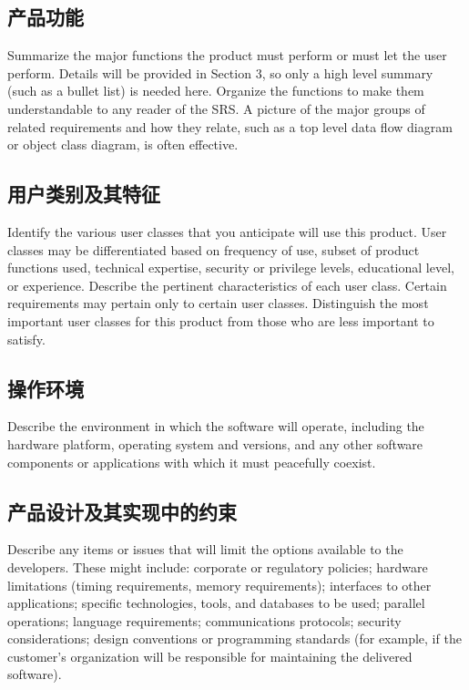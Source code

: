 \documentclass{ctexart}
\begin{document}
\subsection{产品功能}
Summarize the major functions the product must perform or must let the user 
perform. Details will be provided in Section 3, so only a high level summary 
(such as a bullet list) is needed here. Organize the functions to make them 
understandable to any reader of the SRS. A picture of the major groups of 
related requirements and how they relate, such as a top level data flow diagram 
or object class diagram, is often effective.


\subsection{用户类别及其特征}
Identify the various user classes that you anticipate will use this product.  
User classes may be differentiated based on frequency of use, subset of product 
functions used, technical expertise, security or privilege levels, educational 
level, or experience. Describe the pertinent characteristics of each user class.  
Certain requirements may pertain only to certain user classes. Distinguish the 
most important user classes for this product from those who are less important 
to satisfy.


\subsection{操作环境}
Describe the environment in which the software will operate, including the 
hardware platform, operating system and versions, and any other software 
components or applications with which it must peacefully coexist.


\subsection{产品设计及其实现中的约束}
Describe any items or issues that will limit the options available to the 
developers. These might include: corporate or regulatory policies; hardware 
limitations (timing requirements, memory requirements); interfaces to other 
applications; specific technologies, tools, and databases to be used; parallel 
operations; language requirements; communications protocols; security 
considerations; design conventions or programming standards (for example, if the 
customer's organization will be responsible for maintaining the delivered 
software).
\end{document}
